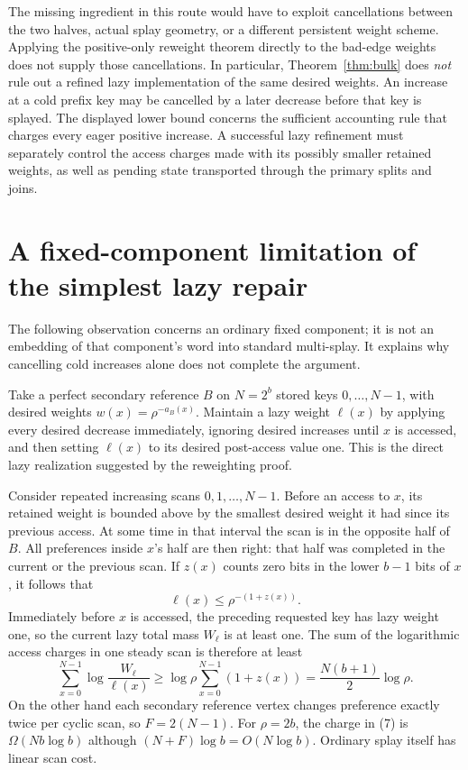 \documentclass[11pt]{article}
\begin{document}
The missing ingredient in this route would have to exploit cancellations
between the two halves, actual splay geometry, or a different persistent
weight scheme. Applying the positive-only reweight theorem directly
to the bad-edge weights does not supply those cancellations.
In particular, Theorem~\ref{thm:bulk} does \emph{not} rule out a refined
lazy implementation of the same desired weights. An increase at a cold
prefix key may be cancelled by a later decrease before that key is
splayed. The displayed lower bound concerns the sufficient accounting
rule that charges every eager positive increase. A successful lazy
refinement must separately control the access charges made with its
possibly smaller retained weights, as well as pending state transported
through the primary splits and joins.

\section{A fixed-component limitation of the simplest lazy repair}

The following observation concerns an ordinary fixed component; it is
not an embedding of that component's word into standard multi-splay.
It explains why cancelling cold increases alone does not complete the
argument.

Take a perfect secondary reference $B$ on $N=2^b$ stored keys
$0,\ldots,N-1$, with desired weights $w(x)=\rho^{-a_B(x)}$.
Maintain a lazy weight $\ell(x)$ by applying every desired decrease
immediately, ignoring desired increases until $x$ is accessed, and
then setting $\ell(x)$ to its desired post-access value one. This is
the direct lazy realization suggested by the reweighting proof.

Consider repeated increasing scans $0,1,\ldots,N-1$. Before an access
to $x$, its retained weight is bounded above by the smallest desired
weight it had since its previous access. At some time in that interval
the scan is in the opposite half of $B$. All preferences inside $x$'s
half are then right: that half was completed in the current or the
previous scan. If $z(x)$ counts zero bits in the lower $b-1$ bits of
$x$, it follows that
\[
 \ell(x)\le\rho^{-(1+z(x))}.                  \tag{6}
\]
Immediately before $x$ is accessed, the preceding requested key has
lazy weight one, so the current lazy total mass $W_{\ell}$ is at least
one. The sum of the logarithmic access charges in one steady scan is
therefore at least
\[
 \sum_{x=0}^{N-1}\log\frac{W_{\ell}}{\ell(x)}
 \ge \log\rho\sum_{x=0}^{N-1}(1+z(x))
 =\frac{N(b+1)}2\log\rho.                    \tag{7}
\]
On the other hand each secondary reference vertex changes preference
exactly twice per cyclic scan, so $F=2(N-1)$. For $\rho=2b$, the
charge in (7) is $\Omega(Nb\log b)$ although
$(N+F)\log b=O(N\log b)$. Ordinary splay itself has linear scan cost.
\end{document}

